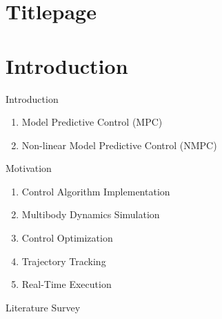 \documentclass{beamer}
\begin{document}
\section*{Titlepage}
\begin{frame}\titlepage\end{frame}

\section{Introduction}
\begin{frame}{Introduction}
    \begin{enumerate}
        \item Model Predictive Control (MPC)
        \item Non-linear Model Predictive Control (NMPC)
    \end{enumerate}
\end{frame}\normalfont

\begin{frame}{Motivation}
\begin{enumerate}
        \item Control Algorithm Implementation
        \item Multibody Dynamics Simulation
        \item Control Optimization
        \item Trajectory Tracking 
        \item Real-Time Execution 
    \end{enumerate}

\end{frame}

\begin{frame}{Literature Survey}

\end{frame}
\end{document}
